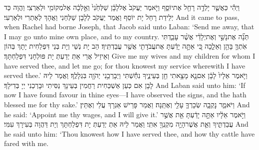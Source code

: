 {וַיְהִ֕י כַּאֲשֶׁ֛ר יָלְדָ֥ה רָחֵ֖ל אֶת\maqqaf יוֹסֵ֑ף וַיֹּ֤אמֶר יַעֲקֹב֙ אֶל\maqqaf לָבָ֔ן שַׁלְּחֵ֙נִי֙ וְאֵ֣לְכָ֔ה אֶל\maqqaf מְקוֹמִ֖י וּלְאַרְצִֽי׃}
{וַהֲוָה כַּד יְלֵידַת רָחֵל יָת יוֹסֵף וַאֲמַר יַעֲקֹב לְלָבָן שַׁלְּחַנִי וַאֲהָךְ לְאַתְרִי וּלְאַרְעִי׃}
{And it came to pass, when Rachel had borne Joseph, that Jacob said unto Laban: ‘Send me away, that I may go unto mine own place, and to my country.}{}
{תְּנָ֞ה אֶת\maqqaf נָשַׁ֣י וְאֶת\maqqaf יְלָדַ֗י אֲשֶׁ֨ר עָבַ֧דְתִּי אֹֽתְךָ֛ בָּהֵ֖ן וְאֵלֵ֑כָה כִּ֚י אַתָּ֣ה יָדַ֔עְתָּ אֶת\maqqaf עֲבֹדָתִ֖י אֲשֶׁ֥ר עֲבַדְתִּֽיךָ׃}
{הַב יָת נְשַׁי וְיָת בְּנַי דִּפְלַחִית יָתָךְ בְּהוֹן וְאֵיזֵיל אֲרֵי אַתְּ יְדַעְתְּ יָת פּוּלְחָנִי דִּפְלַחְתָּךְ׃}
{Give me my wives and my children for whom I have served thee, and let me go; for thou knowest my service wherewith I have served thee.’}{}
{וַיֹּ֤אמֶר אֵלָיו֙ לָבָ֔ן אִם\maqqaf נָ֛א מָצָ֥אתִי חֵ֖ן בְּעֵינֶ֑יךָ נִחַ֕שְׁתִּי וַיְבָרְכֵ֥נִי יְהֹוָ֖ה בִּגְלָלֶֽךָ׃}
{וַאֲמַר לֵיהּ לָבָן אִם כְּעַן אַשְׁכַּחִית רַחֲמִין בְּעֵינָךְ נַסִּיתִי וּבָרְכַנִי יְיָ בְּדִילָךְ׃}
{And Laban said unto him: ‘If now I have found favour in thine eyes—I have observed the signs, and the \lord\space hath blessed me for thy sake.’}{}
{וַיֹּאמַ֑ר נׇקְבָ֧ה שְׂכָרְךָ֛ עָלַ֖י וְאֶתֵּֽנָה׃}
{וַאֲמַר פָּרֵישׁ אַגְרָךְ עֲלַי וְאֶתֵּין׃}
{And he said: ‘Appoint me thy wages, and I will give it.’}{}
{וַיֹּ֣אמֶר אֵלָ֔יו אַתָּ֣ה יָדַ֔עְתָּ אֵ֖ת אֲשֶׁ֣ר עֲבַדְתִּ֑יךָ וְאֵ֛ת אֲשֶׁר\maqqaf הָיָ֥ה מִקְנְךָ֖ אִתִּֽי׃}
{וַאֲמַר לֵיהּ אַתְּ יְדַעְתְּ יָת דִּפְלַחְתָּךְ וְיָת דַּהֲוָה בְּעִירָךְ עִמִּי׃}
{And he said unto him: ‘Thou knowest how I have served thee, and how thy cattle have fared with me.}{}
